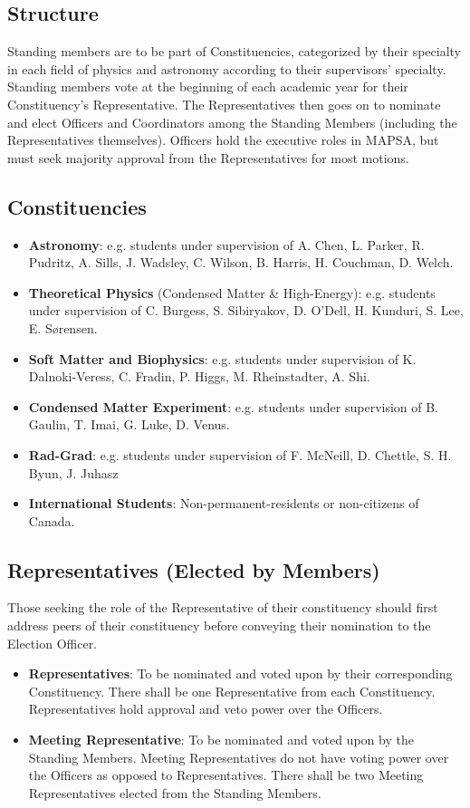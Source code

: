 \documentclass[8pt]{article}
\begin{document}
	\subsection{Structure}
	Standing members are to be part of Constituencies, categorized by their specialty in each field of physics and astronomy according to their supervisors' specialty. Standing members vote at the beginning of each academic year for their Constituency's Representative. The Representatives then goes on to nominate and elect Officers and Coordinators among the Standing Members (including the Representatives themselves). Officers hold the executive roles in MAPSA, but must seek majority approval from the Representatives for most motions. 
	\subsection{Constituencies}
	\begin{itemize}
		\item \textbf{Astronomy}: e.g. students under supervision of A. Chen, L. Parker, R. Pudritz, A. Sills, J. Wadsley, C. Wilson, B. Harris, H. Couchman, D. Welch.
		\item \textbf{Theoretical Physics} (Condensed Matter \& High-Energy): e.g. students under supervision of C. Burgess, S. Sibiryakov, D. O'Dell, H. Kunduri, S. Lee, E. Sørensen.
		\item \textbf{Soft Matter and Biophysics}: e.g. students under supervision of K. Dalnoki-Veress, C. Fradin, P. Higgs, M. Rheinstadter, A. Shi.
		\item \textbf{Condensed Matter Experiment}: e.g. students under supervision of B. Gaulin, T. Imai, G. Luke, D. Venus.
		\item \textbf{Rad-Grad}: e.g. students under supervision of F. McNeill, D. Chettle, S. H. Byun, J. Juhasz
		\item \textbf{International Students}: Non-permanent-residents or non-citizens of Canada.
	\end{itemize}
	
	\subsection{Representatives (Elected by Members)}
	Those seeking the role of the Representative of their constituency should first address peers of their constituency before conveying their nomination to the Election Officer. 
	\begin{itemize}
		\item \textbf{Representatives}: To be nominated and voted upon by their corresponding Constituency. There shall be one Representative from each Constituency. Representatives hold approval and veto power over the Officers.
		\item \textbf{Meeting Representative}: To be nominated and voted upon by the Standing Members. Meeting Representatives do not have voting power over the Officers as opposed to Representatives. There shall be two Meeting Representatives elected from the Standing Members.
	\end{itemize}
\end{document}
